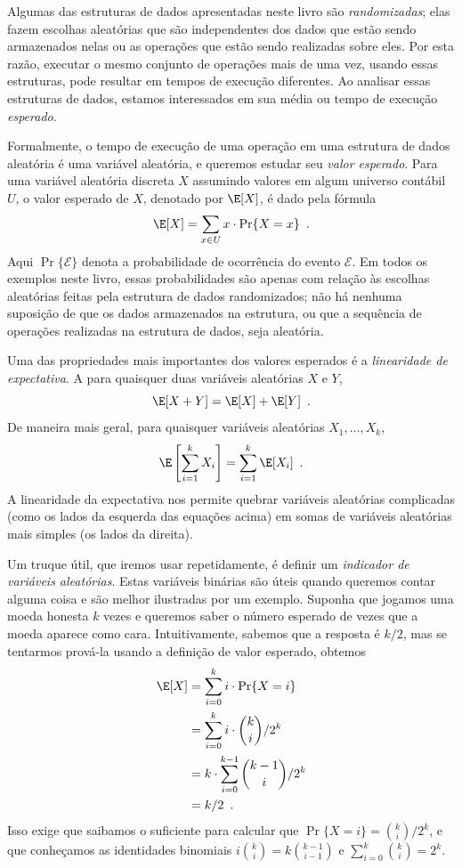 %
%
%
%
Algumas das estruturas de dados apresentadas neste livro são \emph{randomizadas}; elas fazem 
escolhas aleatórias que são independentes dos dados que estão sendo armazenados nelas ou as 
operações que estão sendo realizadas sobre eles. Por esta razão, executar o mesmo conjunto 
de operações mais de uma vez, usando essas estruturas, pode resultar em tempos de execução 
diferentes. Ao analisar essas estruturas de dados, estamos interessados em sua média ou 
tempo de execução \emph{esperado}.
%
%

Formalmente, o tempo de execução de uma operação em uma estrutura de dados aleatória é uma variável aleatória, e queremos estudar seu \emph{valor esperado}. 
%
Para uma variável aleatória discreta $X$ assumindo valores em algum universo contábil $U$, 
o valor esperado de $X$, denotado por $\E[X]$, é dado pela fórmula
\[
\E[X] = \sum_{x\in U} x\cdot\Pr\{X=x\} \enspace .
\]
Aqui $\Pr\{\mathcal{E}\}$ denota a probabilidade de ocorrência do evento 
$\mathcal{E}$. Em todos os exemplos neste livro, essas probabilidades são apenas com relação às escolhas aleatórias feitas pela estrutura de dados randomizados; não há nenhuma suposição de que os dados armazenados na estrutura, ou que a sequência de operações realizadas na estrutura de dados, seja aleatória.

Uma das propriedades mais importantes dos valores esperados é a \emph{linearidade de 
	expectativa}. 
A 
para quaisquer duas variáveis aleatórias $X$ e $Y$,
\[
\E[X+Y] = \E[X] + \E[Y] \enspace .
\]
De maneira mais geral, para quaisquer variáveis aleatórias $X_1,\ldots,X_k$,
\[
\E\left[\sum_{i=1}^k X_i\right] = \sum_{i=1}^k \E[X_i] \enspace .
\]
A linearidade da expectativa nos permite quebrar variáveis aleatórias complicadas (como os 
lados da esquerda das equações acima) em somas de variáveis aleatórias mais simples (os lados da direita).

Um truque útil, que iremos usar repetidamente, é definir um \emph{indicador de variáveis aleatórias}.
%
Estas variáveis binárias são úteis quando queremos contar alguma coisa e são melhor 
ilustradas por um exemplo. Suponha que jogamos uma moeda honesta $k$ vezes e queremos 
saber o número esperado de vezes que a moeda aparece como cara.
%
Intuitivamente, sabemos que a resposta é $k/2$, mas se tentarmos prová-la usando a definição de valor esperado, obtemos
\begin{align*}
\E[X] & = \sum_{i=0}^k i\cdot\Pr\{X=i\} \\
& = \sum_{i=0}^k i\cdot\binom{k}{i}/2^k \\
& = k\cdot \sum_{i=0}^{k-1}\binom{k-1}{i}/2^k \\
& = k/2 \enspace .
\end{align*}
Isso exige que saibamos o suficiente para calcular que $\Pr\{X=i\}
= \binom{k}{i}/2^k$, e que conheçamos as identidades binomiais
$i\binom{k}{i}=k\binom{k-1}{i-1}$ e $\sum_{i=0}^{k} \binom{k}{i} = 2^{k}$.

